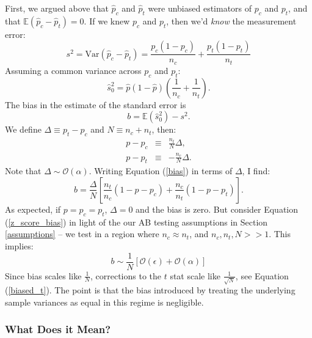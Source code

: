 \documentclass{article}
\numberwithin{equation}{section}
\begin{document}
First, we argued above that $\hat{p}_c$ and $\hat{p}_t$ were unbiased estimators of $p_c$ and $p_t$, and that $\mathbb{E}(\hat{p}_c - \hat{p}_t) = 0$. If we knew $p_c$ and $p_t$, then we'd \textit{know} the measurement error:
\begin{equation}
	s^2 = \mathrm{Var}\left(\hat{p}_c - \hat{p}_t\right) = \frac{p_c(1-p_c)}{n_c} + \frac{p_t(1-p_t)}{n_t}
\end{equation}
Assuming a common variance across $p_c$ and $p_t$:
\begin{equation}
	\hat{s}_0^2 = \hat{p}(1-\hat{p})\left(\frac{1}{n_c} + \frac{1}{n_t}\right).
\end{equation}
The bias in the estimate of the standard error is
\begin{equation} \label{bias}
	b = \mathbb{E}\left(\hat{s}^2_0\right) - s^2.
\end{equation}
We define $\Delta \equiv p_t - p_c$ and $N \equiv n_c + n_t$, then:
\begin{eqnarray}
	p - p_c &\equiv& \frac{n_t}{N} \Delta, \\
	p - p_t &\equiv& -\frac{n_c}{N}\Delta.
\end{eqnarray}
Note that $\Delta \sim \mathcal{O}(\alpha)$. Writing Equation (\ref{bias}) in terms of $\Delta$, I find:
\begin{equation} \label{z_score_bias}
	b = \frac{\Delta}{N}\left[\frac{n_t}{n_c} \left(1-p-p_c\right) + \frac{n_c}{n_t} \left(1-p-p_t\right)\right].
\end{equation} 
As expected, if $p = p_c = p_t$, $\Delta = 0$ and the bias is zero. But consider Equation (\ref{z_score_bias}) in light of the our AB testing assumptions in Section \ref{assumptions} -- we test in a region where $n_c \approx n_t$, and $n_c, n_t, N >> 1$. This implies:
\begin{equation} \label{z_score_bias_scaling}
	b \sim \frac{1}{N}\left[\mathcal{O}(\epsilon) + \mathcal{O}(\alpha)\right]
\end{equation}
Since bias scales like $\frac{1}{N}$, corrections to the $t$ stat scale like $\frac{1}{\sqrt{N}}$, see Equation (\ref{biased_t}). The point is that the bias introduced by treating the underlying sample variances as equal in this regime is negligible. 

\subsubsection{What Does it Mean?}
\end{document}
